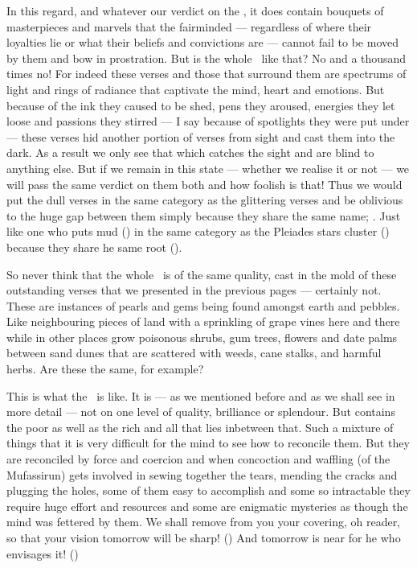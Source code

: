 \documentclass[12pt]{memoir}
\begin{document}
In this regard, and whatever our verdict on the \Quran,
it does contain bouquets of masterpieces and marvels that the fair\–minded —
regardless of where their loyalties lie or
what their beliefs and convictions are —
cannot fail to be moved by them and bow in prostration.
But is the whole \Quran\ like that?
No and a thousand times no!
For indeed these verses and those that surround them
are spectrums of light and rings of radiance
that captivate the mind, heart and emotions.
But because of the ink they caused to be shed, pens they aroused,
energies they let loose and passions they stirred —
I say because of spotlights they were put under —
these verses hid another portion of verses from sight
and cast them into the dark.
As a result we only see that which catches the sight
and are blind to anything else.
But if we remain in this state — whether we realise it or not —
we will pass the same verdict on them both and how foolish is that!
Thus we would put the dull verses in the same category as the glittering verses
and be oblivious to the huge gap between them
simply because they share the same name; \Quran.
Just like one who puts mud () in the same category
as the Pleiades stars cluster ()
because they share he same root ().

So never think that the whole \Quran\ is of the same quality,
cast in the mold of these outstanding verses
that we presented in the previous pages — certainly not.
These are instances of pearls and gems being found amongst earth and pebbles.
Like neighbouring pieces of land with a sprinkling of grape vines here
and there while in other places grow poisonous shrubs, gum trees,
flowers and date palms between sand dunes that are scattered
with weeds, cane stalks, and harmful herbs.
Are these the same, for example?

This is what the \Quran\ is like.
It is — as we mentioned before and as we shall see in more detail —
not on one level of quality, brilliance or splendour.
But contains the poor as well as the rich and all that lies in\–between that.
Such a mixture of things that it is very difficult
for the mind to see how to reconcile them.
But they are reconciled by force and coercion
and when concoction and waffling (of the Mufassirun)
gets involved in sewing together the tears,
mending the cracks and plugging the holes,
some of them easy to accomplish and some so intractable
they require huge effort and resources and some are enigmatic mysteries
as though the mind was fettered by them.
We shall remove from you your covering, oh reader,
so that your vision tomorrow will be sharp!
()
And tomorrow is near for he who envisages it!
()
\end{document}
